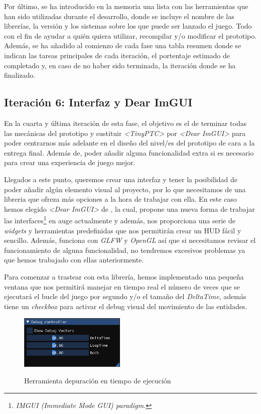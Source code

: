 Por último, se ha introducido en la memoria una lista con las herramientas que han sido utilizadas 
durante el desarrollo, donde se incluye el nombre de las librerías, la versión y los sistemas sobre los que
puede ser lanzado el juego. Todo con el fin de ayudar a quién quiera utilizar, recompilar y/o 
modificar el prototipo. Además, se ha añadido al comienzo de cada fase una tabla resumen donde se indican
las tareas principales de cada iteración, el portentaje estimado de completado y, en caso de no haber sido
terminada, la iteración donde se ha finalizado.


\subsection*{Iteración 6: Interfaz y Dear ImGUI}
En la cuarta y última iteración de esta fase, el objetivo es el de terminar todas las mecánicas del prototipo
y sustituir \textit{\textless TinyPTC\textgreater} por \textit{\textless Dear ImGUI\textgreater} para poder
centrarnos más adelante en el diseño del nivel/es del prototipo de cara a la entrega final. Además de, poder
añadir alguna funcionalidad extra si es necesario para crear una experiencia de juego mejor.

Llegados a este punto, queremos crear una interfaz y tener la posibilidad de poder añadir algún elemento
visual al proyecto, por lo que necesitamos de una libreria que ofreza más opciones a la hora de trabajar
con ella. En este caso hemos elegido \textit{\textless Dear ImGUI\textgreater}
de \citeauthor*{dearimgui2021}, la cual, propone una nueva
forma de trabajar las interfaces\footnote{\textit{IMGUI (Immediate Mode GUI) paradigm.}} en auge actualmente
y además, nos proporciona una serie de \textit{widgets} y herramientas predefinidas que nos permitirán crear 
un HUD fácil y sencillo.
Además, funciona con \textit{GLFW} y \textit{OpenGL} así que si necesitamos revisar el funcionamiento de
alguna funcionalidad, no tendremos excesivos problemas ya que hemos trabajado con ellas anteriormente.


Para comenzar a trastear con esta librería, hemos implementado una pequeña ventana que nos permitirá manejar
en tiempo real el número de veces que se ejecutará el bucle del juego por segundo y/o el tamaño del 
\textit{DeltaTime}, además tiene un \textit{checkbox} para activar el debug visual del movimiento de las
entidades.

\begin{figure}[htb]
\centering
\includegraphics[width=0.45\textwidth]{imagenes/diario_desarrollo/hudDebug.png}\\
\caption{Herramienta depuración en tiempo de ejecución}
\label{fig:hudDebug}
\end{figure}

